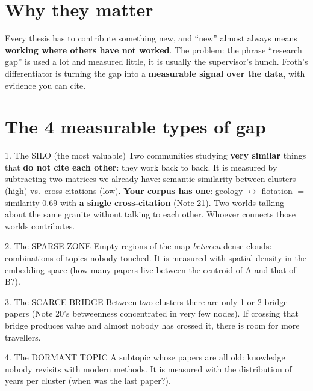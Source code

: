 \documentclass[11pt,a4paper]{article}
\begin{document}

\section{Why they matter}

Every thesis has to contribute something new, and ``new'' almost always means \textbf{working
where others have not worked}. The problem: the phrase ``research gap'' is used a lot and
measured little, it is usually the supervisor's hunch. Froth's differentiator is turning the
gap into a \textbf{measurable signal over the data}, with evidence you can cite.

\section{The 4 measurable types of gap}

\begin{concepto}{1. The SILO (the most valuable)}
Two communities studying \textbf{very similar} things that \textbf{do not cite each other}:
they work back to back. It is measured by subtracting two matrices we already have: semantic
similarity between clusters (high) vs.\ cross-citations (low). \textbf{Your corpus has one}:
geology $\leftrightarrow$ flotation $=$ similarity 0.69 with \textbf{a single cross-citation}
(Note 21). Two worlds talking about the same granite without talking to each other. Whoever
connects those worlds contributes.
\end{concepto}

\begin{concepto}{2. The SPARSE ZONE}
Empty regions of the map \emph{between} dense clouds: combinations of topics nobody touched.
It is measured with spatial density in the embedding space (how many papers live between the
centroid of A and that of B?).
\end{concepto}

\begin{concepto}{3. The SCARCE BRIDGE}
Between two clusters there are only 1 or 2 bridge papers (Note 20's betweenness concentrated
in very few nodes). If crossing that bridge produces value and almost nobody has crossed it,
there is room for more travellers.
\end{concepto}

\begin{concepto}{4. The DORMANT TOPIC}
A subtopic whose papers are all old: knowledge nobody revisits with modern methods. It is
measured with the distribution of years per cluster (when was the last paper?).
\end{concepto}
\end{document}

